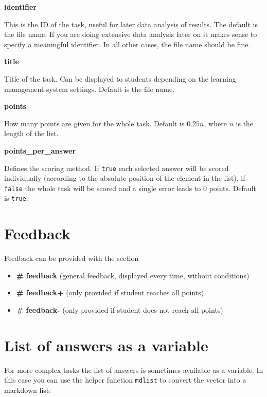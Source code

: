 \documentclass[twoside]{tufte-book}
\providecommand{\tightlist}{%
  \setlength{\itemsep}{0pt}\setlength{\parskip}{0pt}}
\begin{document}
\noindent\textbf{identifier}\label{identifier-5}

This is the ID of the task, useful for later data analysis of results. The default is the file name. If you are doing extensive data analysis later on it makes sense to
specify a meaningful identifier. In all other cases, the file name should be
fine.

\noindent\textbf{title}\label{title-5}

Title of the task. Can be displayed to students depending on the learning management system settings. Default is the file name.

\noindent\textbf{points}\label{points-6}

How many points are given for the whole task. Default is \(0.25n\), where \(n\) is the length of the list.

\noindent\textbf{points\_per\_answer}\label{points_per_answer}

Defines the scoring method. If \texttt{true} each selected answer will be scored individually (according to the absolute position of the element in the list), if \texttt{false} the whole task will be scored and a single error leads to 0 points. Default is \texttt{true}.

\section{Feedback}\label{feedback-5}

Feedback can be provided with the section

\begin{itemize}
\tightlist
\item
  \textbf{\# feedback} (general feedback, displayed every time, without conditions)
\item
  \textbf{\# feedback+} (only provided if student reaches all points)
\item
  \textbf{\# feedback-} (only provided if student does not reach all points)
\end{itemize}

\section{List of answers as a variable}\label{list-of-answers-as-a-variable-2}

For more complex tasks the list of answers is sometimes available as a variable. In this case you can use the helper function \texttt{mdlist} to convert the vector into a markdown list:
\end{document}
